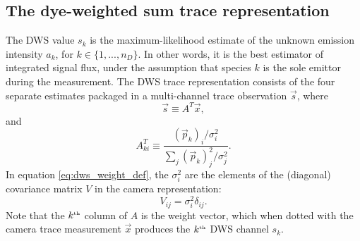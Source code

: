 \documentclass[10pt]{article}
\newcommand{\dws}{{\small DWS}}
\newcommand{\smrt}{{\small SMRT\texttrademark}}
\begin{document}
\subsection{The dye-weighted sum trace representation}
\label{sec:dws}
The \dws{} value $s_k$ is the maximum-likelihood estimate of the unknown emission intensity $a_k$, for $k \in \{1,...,n_D\}$.
In other words, it is the best estimator of integrated signal flux, under the assumption that species $k$ is the sole emittor during the measurement.
The \dws{} trace representation consists of the four separate estimates  packaged in a multi-channel trace observation $\vec{s}$, where~\cite{Gehman2010}
\begin{equation}
\vec{s} \equiv A^T \vec{x}, \label{eq:dws_def}
\end{equation}
and
\begin{equation}
A^T_{ki} \equiv \frac{(\vec{p}_k)_i / \sigma^2_i}{\sum_j{(\vec{p}_k)_j^2/\sigma_j^2}}. \label{eq:dws_weight_def}
\end{equation}
In equation \eqref{eq:dws_weight_def}, the $\sigma_i^2$ are the elements of the (diagonal) covariance matrix $V$ in the camera representation:
\begin{equation}
V_{ij} = \sigma_i^2 \delta_{ij}. \label{eq:cam_covar}
\end{equation}
Note that the $k^{\mbox{\tiny th}}$ column of $A$ is the weight vector, which when dotted with the camera trace measurement $\vec{x}$ produces the $k^{\mbox{\tiny th}}$ \dws{} channel $s_k$.
\end{document}
